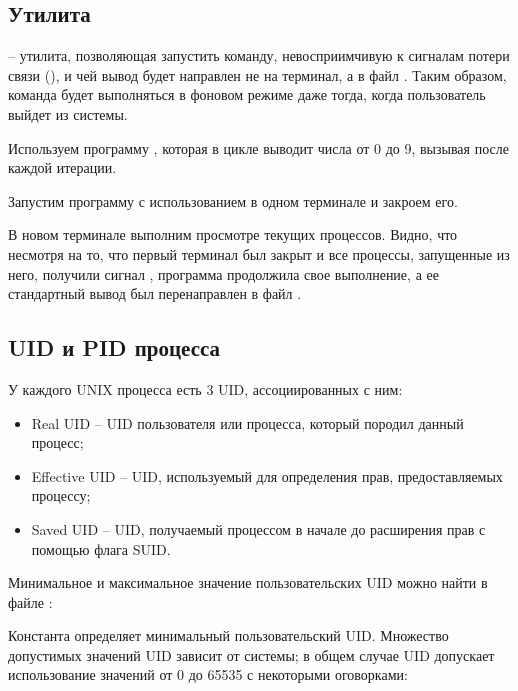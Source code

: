 \subsection{Утилита }

 -- утилита, позволяющая запустить команду, невосприимчивую к сигналам потери связи (), и чей вывод будет направлен не на терминал, а в файл . Таким образом, команда будет выполняться в фоновом режиме даже тогда, когда пользователь выйдет из системы. 

Используем программу , которая в цикле выводит числа от 0 до 9, вызывая  после каждой итерации. 



Запустим программу с использованием  в одном терминале и закроем его.



В новом терминале выполним просмотре текущих процессов. Видно, что несмотря на то, что первый терминал был закрыт и все процессы, запущенные из него, получили сигнал , программа  продолжила свое выполнение, а ее стандартный вывод был перенаправлен в файл .



\subsection{UID и PID процесса}

У каждого UNIX процесса есть 3 UID, ассоциированных с ним:

\begin{itemize}
	\item Real UID -- UID пользователя или процесса, который породил данный процесс;
	\item Effective UID -- UID, используемый для определения прав, предоставляемых процессу;
	\item Saved UID -- UID, получаемый процессом в начале до расширения прав с помощью флага SUID.
\end{itemize}

Минимальное и максимальное значение пользовательских UID можно найти в файле :


Константа  определяет минимальный пользовательский UID. Множество допустимых значений UID зависит от системы; в общем случае UID допускает использование значений от 0 до 65535 с некоторыми оговорками:

